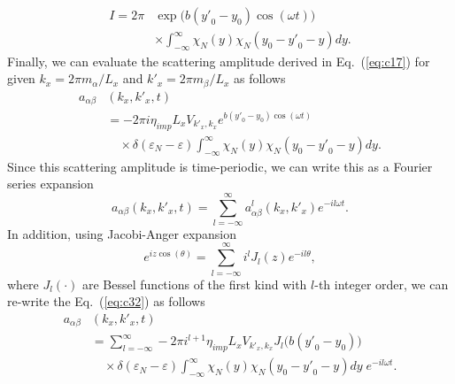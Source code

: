 \documentclass[
 reprint,
 amsmath,amssymb,
 aps,
 prb,
]{revtex4-2}
\begin{document}
\begin{appendix}
\begin{equation} \label{eq:c31}
  \begin{aligned}
    I =
    {2\pi} &
    \exp \bm{(} b({y'}_0 - y_0)\cos(\omega t) \bm{)} \\
    & \times
    \int_{-\infty}^{\infty}
    {\chi}_{N}(y)
    {\chi}_{N}(y_0 - {y'}_0 - y) dy.
  \end{aligned}
\end{equation}
Finally, we can evaluate the scattering amplitude derived in Eq.~(\ref{eq:c17}) for given $k_x = 2\pi m_{\alpha}/L_x$ and $k'_x =  2\pi m_{\beta}/L_x$ as follows
\begin{equation} \label{eq:c32}
  \begin{aligned}
    a_{\alpha\beta}&(k_x,k'_x,t)
    \\
    & =
    -2\pi i
    \eta_{imp} L_x V_{{k'}_x,k_x}
    e^{ b({y'}_0 - y_0)\cos(\omega t)}\\
    & \quad\times
    \delta(\varepsilon_{N} - \varepsilon)
    \int_{-\infty}^{\infty}
    {\chi}_{N}(y)
    {\chi}_{N}(y_0 - {y'}_0 - y) dy.
  \end{aligned}
\end{equation}
Since this scattering amplitude is time-periodic, we can write this as a Fourier series expansion
\begin{equation} \label{eq:c33}
    a_{\alpha\beta}(k_x,k'_x,t) =
    \sum_{l=-\infty}^{\infty} a^l_{\alpha\beta}(k_x,k'_x) e^{-il\omega t}.
\end{equation}
In addition, using Jacobi-Anger expansion \cite{cuyt08,abramowitz64}
\begin{equation} \label{eq:c34}
    e^{iz\cos(\theta)} = \sum_{l=-\infty}^{\infty} i^l J_l(z) e^{-il\theta},
\end{equation}
where $J_l(\cdot)$ are Bessel functions of the first kind with $l$-th integer order, we can re-write the Eq.~(\ref{eq:c32}) as follows
\begin{equation} \label{eq:c35}
  \begin{aligned}
    a_{\alpha\beta}&(k_x,k'_x,t)  \\
    & =
    \sum_{l=-\infty}^{\infty}
    -2\pi i^{l+1}
    \eta_{imp} L_x V_{{k'}_x,k_x}
    J_l\bm{(}b({y'}_0 - y_0)\bm{)} \\
    & \quad\times
    \delta(\varepsilon_{N} - \varepsilon)
    \int_{-\infty}^{\infty}
    {\chi}_{N}(y)
    {\chi}_{N}(y_0 - {y'}_0 - y)  dy \;e^{-il\omega t}.
  \end{aligned}
\end{equation}

\end{appendix}
\end{document}

